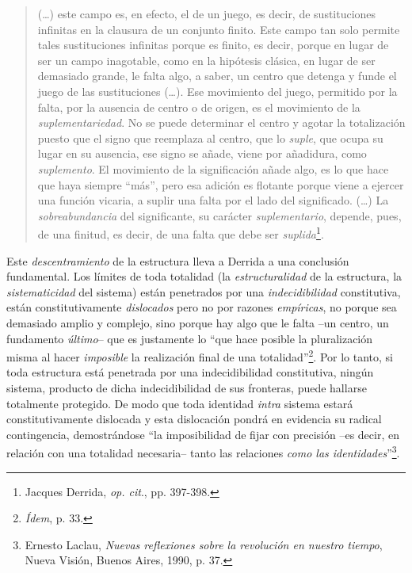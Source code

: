 \begin{quote}
(\dots) este campo es, en efecto, el de un juego, es decir, de
sustituciones infinitas en la clausura de un conjunto finito. Este campo
tan solo permite tales sustituciones infinitas porque es finito, es
decir, porque en lugar de ser un campo inagotable, como en la hipótesis
clásica, en lugar de ser demasiado grande, le falta algo, a saber, un
centro que detenga y funde el juego de las sustituciones (\dots).
Ese movimiento del juego, permitido por la falta, por la ausencia de
centro o de origen, es el movimiento de la \emph{suplementariedad}. No
se puede determinar el centro y agotar la totalización puesto que el
signo que reemplaza al centro, que lo \emph{suple}, que ocupa su lugar
en su ausencia, ese signo se añade, viene por añadidura, como
\emph{suplemento}. El movimiento de la significación añade algo, es lo
que hace que haya siempre ``más'', pero esa adición es flotante porque
viene a ejercer una función vicaria, a suplir una falta por el lado del
significado. (\dots) La \emph{sobreabundancia} del significante, su
carácter \emph{suplementario}, depende, pues, de una finitud, es decir,
de una falta que debe ser \emph{suplida}\footnote{Jacques Derrida,
  \emph{op. cit}., pp. 397-398.}.
\end{quote}

Este \emph{descentramiento} de la estructura lleva a Derrida a una
conclusión fundamental. Los límites de toda totalidad (la
\emph{estructuralidad} de la estructura, la \emph{sistematicidad} del
sistema) están penetrados por una \emph{indecidibilidad} constitutiva,
están constitutivamente \emph{dislocados} pero no por razones
\emph{empíricas}, no porque sea demasiado amplio y complejo, sino porque
hay algo que le falta --un centro, un fundamento \emph{último}-- que es
justamente lo \enquote{que hace posible la pluralización misma al hacer
\emph{imposible} la realización final de una totalidad}\footnote{\emph{Ídem},
  p. 33.}. Por lo tanto, si toda estructura está penetrada por una
indecidibilidad constitutiva, ningún sistema, producto de dicha
indecidibilidad de sus fronteras, puede hallarse totalmente protegido.
De modo que toda identidad \emph{intra} sistema estará constitutivamente
dislocada y esta dislocación pondrá en evidencia su radical
contingencia, demostrándose \enquote{la imposibilidad de fijar con precisión
--es decir, en relación con una totalidad necesaria-- tanto las
relaciones \emph{como las identidades}}\footnote{Ernesto Laclau,
  \emph{Nuevas reflexiones sobre la revolución en nuestro tiempo}, Nueva
  Visión, Buenos Aires, 1990, p. 37.}.

